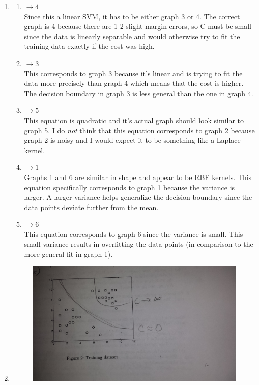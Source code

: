 \documentclass{article}
\begin{document}
\begin{enumerate}
=======
	\item
	\begin{enumerate}
		\item $\longrightarrow 4$\\
		Since this a linear SVM, it has to be either graph 3 or 4. The correct graph is 4 because there are 1-2 slight margin errors, so C must be small since the data is linearly separable and would otherwise try to fit the training data exactly if the cost was high.
		\item $\longrightarrow 3$\\
		This corresponds to graph 3 because it's linear and is trying to fit the data more precisely than graph 4 which means that the cost is higher. The decision boundary in graph 3 is less general than the one in graph 4.
		\item $\longrightarrow 5$\\
		This equation is quadratic and it's actual graph should look similar to graph 5. I do \textit{not} think that this equation corresponds to graph 2 because graph 2 is noisy and I would expect it to be something like a Laplace kernel.  
		\item $\longrightarrow 1$\\
		Graphs 1 and 6 are similar in shape and appear to be RBF kernels. This equation specifically corresponds to graph 1 because the variance is larger. A larger variance helps generalize the decision boundary since the data points deviate further from the mean.
		\item $\longrightarrow 6$\\
		This equation corresponds to graph 6 since the variance is small. This small variance results in overfitting the data points (in comparison to the more general fit in graph 1).
	\end{enumerate}
	\item
	\begin{enumerate}
		\begin{figure}[h]
		\includegraphics[scale=0.10]{hw2_ques1_2_ab}

\end{figure}
\end{enumerate}
\end{enumerate}
\end{document}
